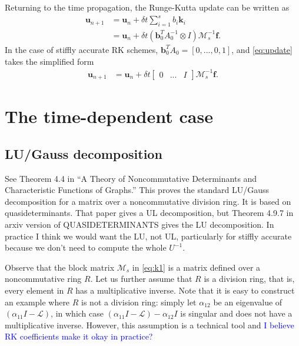 \documentclass[a4paper,10pt]{article}
\newcommand{\tcb}{\textcolor{blue}}
\begin{document}
Returning to the time propagation, the Runge-Kutta update can be written as
%
\begin{align}\nonumber
\mathbf{u}_{n+1} & = \mathbf{u}_n + \delta t\sum_{i=1}^s b_i{\mathbf{k}}_i \\
& = \mathbf{u}_n + \delta t(\mathbf{b}_0^TA_0^{-1}\otimes I)\mathcal{M}_s^{-1}\mathbf{f}.\label{eq:update}
\end{align}
%
In the case of stiffly accurate RK schemes, $\mathbf{b}_0^TA_0 = [0,...,0,1]$,
and \eqref{eq:update} takes the simplified form
%
\begin{align*}
\mathbf{u}_{n+1} & = \mathbf{u}_n + \delta t\begin{bmatrix}0 & ... & I \end{bmatrix}
	\mathcal{M}_s^{-1}\mathbf{f}.
\end{align*}
%

\section{The time-dependent case}

\subsection{LU/Gauss decomposition}

See Theorem 4.4 in ``A Theory of Noncommutative Determinants and Characteristic Functions of Graphs.''
This proves the standard LU/Gauss decomposition for a matrix over a noncommutative division ring.
It is based on quasideterminants. That paper gives a UL decomposition, but Theorem 4.9.7 in
arxiv version of QUASIDETERMINANTS gives the LU decomposition. In practice I think we would want
the LU, not UL, particularly for stiffly accurate because we don't need to compute the whole $U^{-1}$. 

Observe that the block matrix $\mathcal{M}_s$ in \eqref{eq:k1} is a matrix defined over a 
noncommutative ring $R$. Let us further assume that $R$ is a division ring, that is, every 
element in $R$ has a multiplicative inverse. Note that it is easy to construct an example
where $R$ is not a division ring: simply let $\alpha_{12}$ be an eigenvalue of $(\alpha_{11}I - \mathcal{L})$,
in which case $(\alpha_{11}I - \mathcal{L}) - \alpha_{12}I$ is singular and does not have
a multiplicative inverse. However, this assumption is a technical tool and \tcb{I believe
RK coefficients make it okay in practice?}
\end{document}

